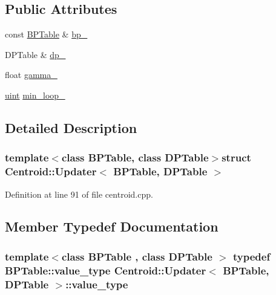 \subsection*{Public Attributes}
\begin{DoxyCompactItemize}
\item 
const \hyperlink{folding__engine_8h_a065821fb17bbd8df315f2435c973e3c1}{B\+P\+Table} \& \hyperlink{struct_centroid_1_1_updater_a9769d7141589366c4e6d031b267c8dc4}{bp\+\_\+}
\item 
D\+P\+Table \& \hyperlink{struct_centroid_1_1_updater_ad9d56e0acfb53e8a044c674aa9044381}{dp\+\_\+}
\item 
float \hyperlink{struct_centroid_1_1_updater_a3dd3233bf978ca8c9b5b7d424120b777}{gamma\+\_\+}
\item 
\hyperlink{cyktable_8h_a91ad9478d81a7aaf2593e8d9c3d06a14}{uint} \hyperlink{struct_centroid_1_1_updater_a8de12893eea4e0759964678717585026}{min\+\_\+loop\+\_\+}
\end{DoxyCompactItemize}


\subsection{Detailed Description}
\subsubsection*{template$<$class B\+P\+Table, class D\+P\+Table$>$struct Centroid\+::\+Updater$<$ B\+P\+Table, D\+P\+Table $>$}



Definition at line 91 of file centroid.\+cpp.



\subsection{Member Typedef Documentation}
\hypertarget{struct_centroid_1_1_updater_a2cee1d3de499b9e7ccd74269e0e6a9f1}{
\subsubsection[{value\+\_\+type}]{\setlength{\rightskip}{0pt plus 5cm}template$<$class B\+P\+Table , class D\+P\+Table $>$ typedef {\bf B\+P\+Table\+::value\+\_\+type} {\bf Centroid\+::\+Updater}$<$ {\bf B\+P\+Table}, D\+P\+Table $>$\+::{\bf value\+\_\+type}}}\label{struct_centroid_1_1_updater_a2cee1d3de499b9e7ccd74269e0e6a9f1}



